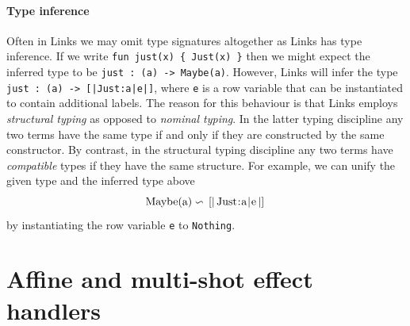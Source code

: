\documentclass[12pt,mscres,cdtppar,twoside,openright,logo,rightchapter,normalheadings]{infthesis}
\theoremstyle{definition}
\begin{document}
\paragraph{Type inference} Often in Links we may omit type signatures
altogether as Links has type inference. If we write
\lstinline$fun just(x) { Just(x) }$ then we might expect the inferred
type to be \lstinline$just : (a) -> Maybe(a)$. However, Links will
infer the type \lstinline$just : (a) -> [|Just:a|e|]$, where
\lstinline$e$ is a row variable that can be instantiated to contain
additional labels. The reason for this behaviour is that Links employs
\emph{structural typing} as opposed to \emph{nominal typing}. In the
latter typing discipline any two terms have the same type if and only
if they are constructed by the same constructor. By contrast, in the
structural typing discipline any two terms have \emph{compatible}
types if they have the same structure. For example, we can unify the
given type and the inferred type above
\[
\text{\lstinline$Maybe(a)$} \backsim \text{\lstinline$[|Just:a|e|]$}
\]
by instantiating the row variable \lstinline$e$ to
\lstinline$Nothing$.

\section{Affine and multi-shot effect handlers}
\label{sec:links-affine-multi}
\end{document}
